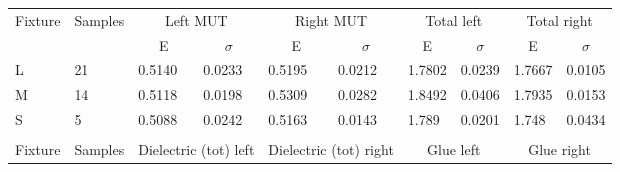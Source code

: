 \documentclass[11pt,a4paper]{article}
\begin{document}
    \begin{table}[!b]
        \tiny
        \begin{tabular}{llllllllll}
            \hline
            \multicolumn{1}{|c|}{\multirow{2}{*}{Fixture}} & \multicolumn{1}{c|}{\multirow{2}{*}{Samples}} & \multicolumn{2}{c|}{Left MUT}                               & \multicolumn{2}{c|}{Right MUT}                              & \multicolumn{2}{c|}{Total left}                             & \multicolumn{2}{c|}{Total right}                            \\ \cline{3-10}
            \multicolumn{1}{|c|}{}  & \multicolumn{1}{c|}{}   & \multicolumn{1}{c|}{E}      & \multicolumn{1}{c|}{$\sigma$} & \multicolumn{1}{c|}{E}      & \multicolumn{1}{c|}{$\sigma$} & \multicolumn{1}{c|}{E}      & \multicolumn{1}{c|}{$\sigma$} & \multicolumn{1}{c|}{E}      & \multicolumn{1}{c|}{$\sigma$} \\ \hline
            \multicolumn{1}{|l|}{L} & \multicolumn{1}{l|}{21} & \multicolumn{1}{l|}{0.5140} & \multicolumn{1}{l|}{0.0233}   & \multicolumn{1}{l|}{0.5195} & \multicolumn{1}{l|}{0.0212}   & \multicolumn{1}{l|}{1.7802} & \multicolumn{1}{l|}{0.0239}   & \multicolumn{1}{l|}{1.7667} & \multicolumn{1}{l|}{0.0105}   \\ \hline
            \multicolumn{1}{|l|}{M} & \multicolumn{1}{l|}{14} & \multicolumn{1}{l|}{0.5118} & \multicolumn{1}{l|}{0.0198}   & \multicolumn{1}{l|}{0.5309} & \multicolumn{1}{l|}{0.0282}   & \multicolumn{1}{l|}{1.8492} & \multicolumn{1}{l|}{0.0406}   & \multicolumn{1}{l|}{1.7935} & \multicolumn{1}{l|}{0.0153}   \\ \hline
            \multicolumn{1}{|l|}{S} & \multicolumn{1}{l|}{5}  & \multicolumn{1}{l|}{0.5088} & \multicolumn{1}{l|}{0.0242}   & \multicolumn{1}{l|}{0.5163} & \multicolumn{1}{l|}{0.0143}   & \multicolumn{1}{l|}{1.789}  & \multicolumn{1}{l|}{0.0201}   & \multicolumn{1}{l|}{1.748}  & \multicolumn{1}{l|}{0.0434}   \\ \hline
            &                         &                             &                               &                             &                               &                             &                               &                             &                               \\ \hline
            \multicolumn{1}{|c|}{Fixture} & \multicolumn{1}{c|}{Samples} & \multicolumn{2}{l|}{Dielectric (tot) left}                  & \multicolumn{2}{l|}{Dielectric (tot) right}                 & \multicolumn{2}{c|}{Glue left}                              & \multicolumn{2}{c|}{Glue right}                             \\ \hline

\end{tabular}
\end{table}
\end{document}
